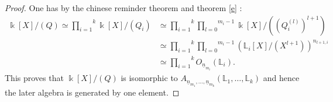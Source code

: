 \documentclass[12pt, reqno]{amsart}
\newcommand{\K}{ {\Bbbk} }
\newcommand{\FL}{ {\mathbb L} }
\begin{document}
\begin{proof}
One has by the chinese reminder theorem and theorem \ref{e} : \begin{align*} \K[X]/(Q)\simeq\overset{k}{\underset{i=1}{\prod}}\K[X]/(Q_i)&\simeq \overset{k}{\underset{i=1}{\prod}}\overset{m_i-1}{\underset{l=0}{\prod}}\K[X]/((Q_i^{(l)})^{l+1})\\&\simeq \overset{k}{\underset{i=1}{\prod}}\overset{m_i-1}{\underset{l=0}{\prod}}(\FL_i[X]/(X^{l+1}))^{n_{l+1,i}}\\& \simeq  \overset{k}{\underset{i=1}{\prod}} O_{\underline{n}_{m_i}}(\FL_i) .\end{align*}
This proves that $\K[X]/(Q)$ is isomorphic to $A_{\underline{n}_{m_1},\dots, \underline{n}_{m_k}}(\FL_1,\dots ,\FL_k)$ and hence the later algebra is generated by one element.
\end{proof}
\end{document}
